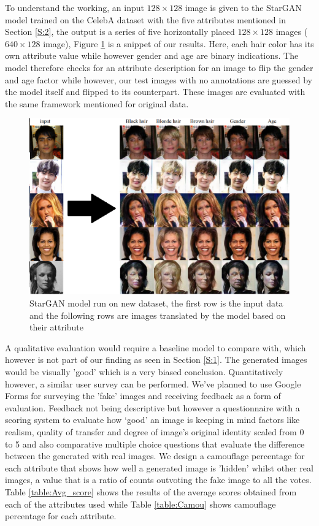 \documentclass[preprint,12pt]{elsarticle}
\begin{document}
To understand the working, an input $128\times128$ image is given to the StarGAN model trained on the CelebA dataset with the five attributes mentioned in Section \ref{S:2}, the output is a series of five horizontally placed $128\times128$ images ($640\times128$ image), Figure \ref{fig:StarGAN_new} is a snippet of our results. Here, each hair color has its own attribute value while however gender and age are binary indications. The model therefore checks for an attribute description for an image to flip the gender and age factor while however, our test images with no annotations are guessed by the model itself and flipped to its counterpart. These images are evaluated with the same framework mentioned for original data.

\begin{figure}[ht]
\centering\includegraphics[width=0.7\linewidth]{StarGAN_newdata.png}
\caption{StarGAN model run on new dataset, the first row is the input data and the following rows are images translated by the model based on their attribute}
\label{fig:StarGAN_new}
\end{figure}

A qualitative evaluation would require a baseline model to compare with, which however is not part of our finding as seen in Section \ref{S:1}. The generated images would be visually 'good' which is a very biased conclusion. Quantitatively however, a similar user survey can be performed. We've planned to use Google Forms for surveying the 'fake' images and receiving feedback as a form of evaluation. Feedback not being descriptive but however a questionnaire with a scoring system to evaluate how ‘good’ an image is keeping in mind factors like realism, quality of transfer and degree of image's original identity scaled from 0 to 5 and also comparative multiple choice questions that evaluate the difference between the generated with real images. We design a camouflage percentage for each attribute that shows how well a generated image is 'hidden' whilst other real images, a value that is a ratio of counts outvoting the fake image to all the votes. Table \ref{table:Avg_score} shows the results of the average scores obtained from each of the attributes used while Table \ref{table:Camou} shows camouflage percentage for each attribute.
\end{document}
